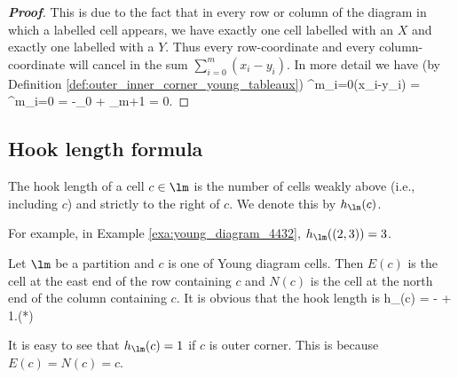 \begin{proof}[\bf Proof]
This is due to the fact that in every row or column of the diagram in which a labelled cell appears, we have exactly one cell labelled with an $X$ and exactly one labelled with a $Y$. Thus every row-coordinate and every column-coordinate will cancel in the sum $\sum^m_{i=0}(x_i-y_i)$. In more detail we have (by Definition \ref{def:outer_inner_corner_young_tableaux})
\be
\sum^m_{i=0}(x_i-y_i) = \sum^m_{i=0} = -\alpha_0 + \alpha_{m+1} = 0.
\ee
\end{proof}


\subsection{Hook length formula}



\begin{definition}
The hook length of a cell $c\in \lm$ is the number of cells weakly above (i.e., including $c$) and strictly to the right of $c$. We denote this by $h_{\lm}(c)$.
\end{definition}

\begin{remark}
For example, in Example \ref{exa:young_diagram_4432}, $h_{\lm}((2,3)) = 3$.
\end{remark}

\begin{definition}\label{def:east_north_young_diagram_hook_length}
Let $\lm$ be a partition and $c$ is one of Young diagram cells. Then $E(c)$ is the cell at the east end of the row containing $c$ and $N(c)$ is the cell at the north end of the column containing $c$. It is obvious that the hook length is
\be
h_{\lm}(c) = \ct{} - \ct{} + 1.\qquad (*)
\ee
\end{definition}

\begin{remark}
It is easy to see that $h_{\lm}(c) = 1$ if $c$ is outer corner. This is because $E(c) = N(c) = c$.
\end{remark}

